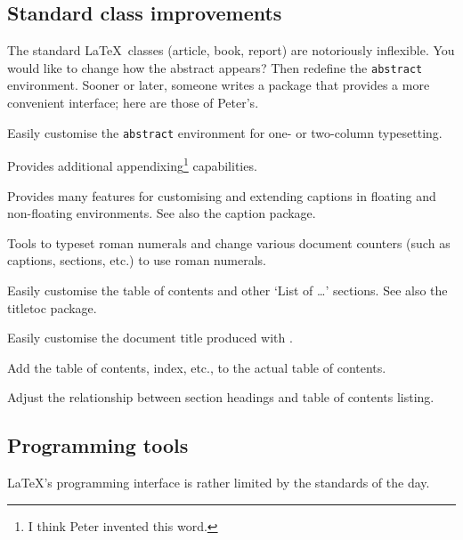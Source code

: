 \documentclass{ltugboat}
\begin{document}
\subsection{Standard class improvements}

The standard \LaTeX\ classes (\textsf{article}, \textsf{book}, \textsf{report}) are notoriously inflexible. You would like to change how the abstract appears? Then redefine the \texttt{abstract} environment. Sooner or later, someone writes a package that provides a more convenient interface; here are those of Peter's.

\begin{description}[font=\normalfont\sffamily]
\item [abstract] Easily customise the \texttt{abstract} environment for one- or two-column typesetting.
\item [appendix] Provides additional appendixing\footnote{I think Peter invented this word.} capabilities.
\item [ccaption] Provides many features for customising and extending captions in floating and non-floating environments. See also the \textsf{caption} package.
\item [romannum] Tools to typeset roman numerals and change various document counters (such as captions, sections, etc.) to use roman numerals.
\item [tocloft] Easily customise the table of contents and other `List of \dots' sections. See also the \textsf{titletoc} package.
\item [titling] Easily customise the document title produced with .
\item [tocbibind] Add the table of contents, index, etc., to the actual table of contents.
\item [tocvsec2] Adjust the relationship between section headings and table of contents listing.
\end{description}

\subsection{Programming tools}

\LaTeX's programming interface is rather limited by the standards of the day.
\end{document}
